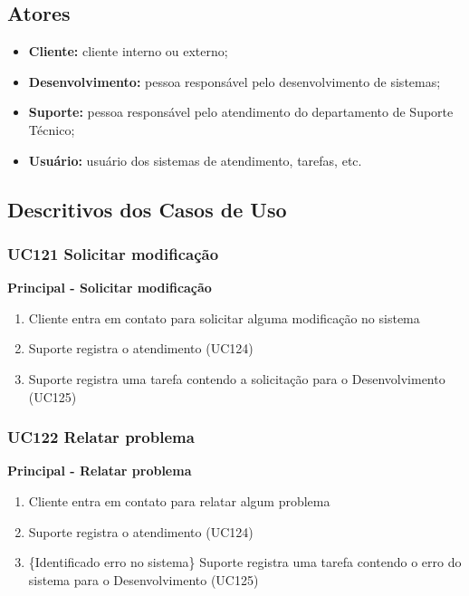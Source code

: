 \subsection{Atores}

\begin{itemize}

\item \textbf{Cliente:} cliente interno ou externo;
\item \textbf{Desenvolvimento:} pessoa responsável pelo desenvolvimento de sistemas;
\item \textbf{Suporte:} pessoa responsável pelo atendimento do departamento de Suporte Técnico;
\item \textbf{Usuário:} usuário dos sistemas de atendimento, tarefas, etc.
 
\end{itemize}

\subsection{Descritivos dos Casos de Uso}

\subsubsection{UC121 Solicitar modificação}

\textbf{Principal - Solicitar modificação}

\begin{enumerate}
\item Cliente entra em contato para solicitar alguma modificação no sistema
\item Suporte registra o atendimento (UC124)
\item Suporte registra uma tarefa contendo a solicitação para o Desenvolvimento (UC125)
\end{enumerate}

\subsubsection{UC122 Relatar problema}

\textbf{Principal - Relatar problema}

\begin{enumerate}
\item Cliente entra em contato para relatar algum problema
\item Suporte registra o atendimento (UC124)
\item \{Identificado erro no sistema\} Suporte registra uma tarefa contendo o erro do sistema para o Desenvolvimento (UC125)
\end{enumerate}

